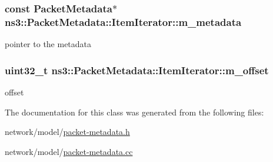 \subsubsection[{\texorpdfstring{m\+\_\+metadata}{m_metadata}}]{\setlength{\rightskip}{0pt plus 5cm}const {\bf Packet\+Metadata}$\ast$ ns3\+::\+Packet\+Metadata\+::\+Item\+Iterator\+::m\+\_\+metadata\hspace{0.3cm}{\ttfamily [private]}}\hypertarget{classns3_1_1PacketMetadata_1_1ItemIterator_a6a91c392408e77624613663198f269a6}{}\label{classns3_1_1PacketMetadata_1_1ItemIterator_a6a91c392408e77624613663198f269a6}


pointer to the metadata 

\subsubsection[{\texorpdfstring{m\+\_\+offset}{m_offset}}]{\setlength{\rightskip}{0pt plus 5cm}uint32\+\_\+t ns3\+::\+Packet\+Metadata\+::\+Item\+Iterator\+::m\+\_\+offset\hspace{0.3cm}{\ttfamily [private]}}\hypertarget{classns3_1_1PacketMetadata_1_1ItemIterator_aa1970b36f1f272fd758b68eea35339a3}{}\label{classns3_1_1PacketMetadata_1_1ItemIterator_aa1970b36f1f272fd758b68eea35339a3}


offset 



The documentation for this class was generated from the following files\+:\begin{DoxyCompactItemize}
\item 
network/model/\hyperlink{packet-metadata_8h}{packet-\/metadata.\+h}\item 
network/model/\hyperlink{packet-metadata_8cc}{packet-\/metadata.\+cc}\end{DoxyCompactItemize}

